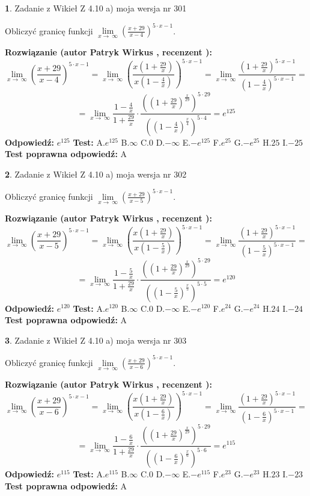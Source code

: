 \documentclass[12pt, a4paper]{article}
\theoremstyle{definition} %
\newtheorem{zad}{}
\newcommand{\zadStart}[1]{\begin{zad}#1\newline}
\newcommand{\zadStop}{\end{zad}}
\newcommand{\rozwStart}[2]{\noindent \textbf{Rozwiązanie (autor #1 , recenzent #2): }\newline}
\newcommand{\rozwStop}{\newline}
\newcommand{\odpStart}{\noindent \textbf{Odpowiedź:}\newline}
\newcommand{\odpStop}{\newline}
\newcommand{\testStart}{\noindent \textbf{Test:}\newline}
\newcommand{\testStop}{\newline}
\newcommand{\kluczStart}{\noindent \textbf{Test poprawna odpowiedź:}\newline}
\newcommand{\kluczStop}{\newline}
\begin{document}
\zadStart{Zadanie z Wikieł Z 4.10 a) moja wersja nr 301}

Obliczyć granicę funkcji  $\lim\limits_{x\to\ \infty}(\frac{x+29}{x-4})^{5\cdot x-1}$.
\zadStop
\rozwStart{Patryk Wirkus}{}
$$\lim\limits_{x\to\ \infty}(\frac{x+29}{x-4})^{5\cdot x-1} = \lim\limits_{x\to\ \infty}(\frac{x(1+\frac{29}{x})}{x(1-\frac{4}{x})})^{5\cdot x-1}=\lim\limits_{x\to\ \infty}\frac{(1+\frac{29}{x})^{5\cdot x-1}}{(1-\frac{4}{x})^{5\cdot x-1}}=$$
$$=\lim\limits_{x\to\ \infty}\frac{1-\frac{4}{x}}{1+\frac{29}{x}}\cdot\frac{((1+\frac{29}{x})^{\frac{x}{29}})^{5\cdot29}}{((1-\frac{4}{x})^{\frac{x}{4}})^{5\cdot4}}=e^{125}$$
\rozwStop
\odpStart
$e^{125}$
\odpStop
\testStart
A.$e^{125}$ B.$\infty$ C.$0$ D.$-\infty$ E.$-e^{125}$
F.$e^{25}$ G.$-e^{25}$
H.$25$
I.$-25$
\testStop
\kluczStart
A
\kluczStop



\zadStart{Zadanie z Wikieł Z 4.10 a) moja wersja nr 302}

Obliczyć granicę funkcji  $\lim\limits_{x\to\ \infty}(\frac{x+29}{x-5})^{5\cdot x-1}$.
\zadStop
\rozwStart{Patryk Wirkus}{}
$$\lim\limits_{x\to\ \infty}(\frac{x+29}{x-5})^{5\cdot x-1} = \lim\limits_{x\to\ \infty}(\frac{x(1+\frac{29}{x})}{x(1-\frac{5}{x})})^{5\cdot x-1}=\lim\limits_{x\to\ \infty}\frac{(1+\frac{29}{x})^{5\cdot x-1}}{(1-\frac{5}{x})^{5\cdot x-1}}=$$
$$=\lim\limits_{x\to\ \infty}\frac{1-\frac{5}{x}}{1+\frac{29}{x}}\cdot\frac{((1+\frac{29}{x})^{\frac{x}{29}})^{5\cdot29}}{((1-\frac{5}{x})^{\frac{x}{5}})^{5\cdot5}}=e^{120}$$
\rozwStop
\odpStart
$e^{120}$
\odpStop
\testStart
A.$e^{120}$ B.$\infty$ C.$0$ D.$-\infty$ E.$-e^{120}$
F.$e^{24}$ G.$-e^{24}$
H.$24$
I.$-24$
\testStop
\kluczStart
A
\kluczStop



\zadStart{Zadanie z Wikieł Z 4.10 a) moja wersja nr 303}

Obliczyć granicę funkcji  $\lim\limits_{x\to\ \infty}(\frac{x+29}{x-6})^{5\cdot x-1}$.
\zadStop
\rozwStart{Patryk Wirkus}{}
$$\lim\limits_{x\to\ \infty}(\frac{x+29}{x-6})^{5\cdot x-1} = \lim\limits_{x\to\ \infty}(\frac{x(1+\frac{29}{x})}{x(1-\frac{6}{x})})^{5\cdot x-1}=\lim\limits_{x\to\ \infty}\frac{(1+\frac{29}{x})^{5\cdot x-1}}{(1-\frac{6}{x})^{5\cdot x-1}}=$$
$$=\lim\limits_{x\to\ \infty}\frac{1-\frac{6}{x}}{1+\frac{29}{x}}\cdot\frac{((1+\frac{29}{x})^{\frac{x}{29}})^{5\cdot29}}{((1-\frac{6}{x})^{\frac{x}{6}})^{5\cdot6}}=e^{115}$$
\rozwStop
\odpStart
$e^{115}$
\odpStop
\testStart
A.$e^{115}$ B.$\infty$ C.$0$ D.$-\infty$ E.$-e^{115}$
F.$e^{23}$ G.$-e^{23}$
H.$23$
I.$-23$
\testStop
\kluczStart
A
\kluczStop
\end{document}
